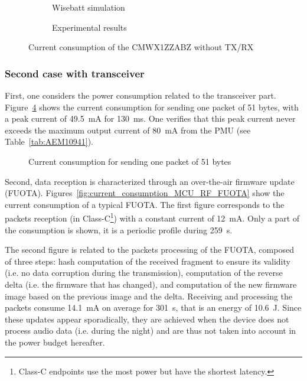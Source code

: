 \documentclass{EPL-master-thesis-covers-EN}
\begin{document}
\begin{figure}[H]
\begin{subfigure}{.49\textwidth}
  \centering
    
    \caption{Wisebatt simulation}
    \label{fig:wisebatt1}
\end{subfigure}
\begin{subfigure}{.49\textwidth}
  \centering
  
  \caption{Experimental results}
  \label{fig:consumption_fft}
\end{subfigure}
\caption{Current consumption of the CMWX1ZZABZ without TX/RX}
\end{figure}


\subsubsection*{Second case with transceiver}

First, one considers the power consumption related to the transceiver part. Figure~\ref{fig:current_consumption_MCU_RF_lorawan_TX} shows the current consumption for sending one packet of 51 bytes, with a peak current of \SI{49.5}{mA} for \SI{130}{ms}. One verifies that this peak current never exceeds the maximum output current of \SI{80}{mA} from the PMU (see Table~\ref{tab:AEM10941}).

\begin{figure}[H]
    \centering
    
    \caption{Current consumption for sending one packet of 51 bytes}
    \label{fig:current_consumption_MCU_RF_lorawan_TX}
\end{figure}

Second, data reception is characterized through an over-the-air firmware update (FUOTA). Figures~\ref{fig:current_consumption_MCU_RF_FUOTA} show the current consumption of a typical FUOTA. The first figure corresponds to the packets reception (in Class-C\footnote{Class-C endpoints use the most power but have the shortest latency.}) with a constant current of \SI{12}{mA}. Only a part of the consumption is shown, it is a periodic profile during \SI{259}{s}.

The second figure is related to the packets processing of the FUOTA, composed of three steps: hash computation of the received fragment to ensure its validity (i.e. no data corruption during the transmission), computation of the reverse delta (i.e. the firmware that has changed), and computation of the new firmware image based on the previous image and the delta. Receiving and processing the packets consume \SI{14.1}{mA} on average for \SI{301}{s}, that is an energy of \SI{10.6}{J}. Since these updates appear sporadically, they are achieved when the device does not process audio data (i.e. during the night) and are thus not taken into account in the power budget hereafter.
\end{document}

